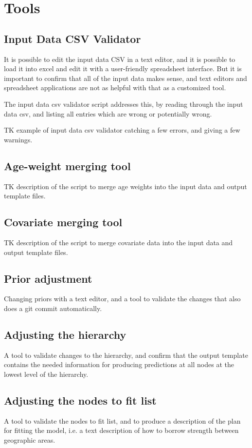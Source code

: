 \section{Tools}
\subsection{Input Data CSV Validator}
It is possible to edit the input data CSV in a text editor, and it is
possible to load it into excel and edit it with a user-friendly
spreadsheet interface.  But it is important to confirm that all of the
input data makes sense, and text editors and spreadsheet applications
are not as helpful with that as a customized tool.

The input data csv validator script addresses this, by reading through
the input data csv, and listing all entries which are wrong or
potentially wrong.

TK example of input data csv validator catching a few errors, and
giving a few warnings.

\subsection{Age-weight merging tool}
TK description of the script to merge age weights into the input data
and output template files.

\subsection{Covariate merging tool}
TK description of the script to merge covariate data into the input
data and output template files.

\subsection{Prior adjustment}
Changing priors with a text editor, and a tool to validate the changes
that also does a git commit automatically.

\subsection{Adjusting the hierarchy}
A tool to validate changes to the hierarchy, and confirm that
the output template contains the needed information for producing
predictions at all nodes at the lowest level of the hierarchy.

\subsection{Adjusting the nodes to fit list}
A tool to validate the nodes to fit list, and to produce a description
of the plan for fitting the model, i.e. a text description of how to
borrow strength between geographic areas.


